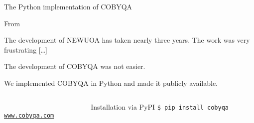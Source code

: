 \documentclass[
]{talk}
\begin{document}
\begin{frame}{The Python implementation of COBYQA}
    \begin{block}{From \textcite{Powell_2006}}
        \begin{quoting}
            \small%
            The development of NEWUOA has taken nearly \alert{three years}.
            The work was very \alert{frustrating} [\dots]
        \end{quoting}
        The development of COBYQA was \alert{not easier}.
    \end{block}

    \medskip

    We implemented COBYQA in \alert{Python} and made it publicly available.

    \medskip

    \begin{columns}
        \begin{column}{0.4\textwidth}
            \begin{center}
                \\[1ex]
                \href{https://www.cobyqa.com}{\texttt{www.cobyqa.com}}
            \end{center}
        \end{column}
        \begin{column}{0.6\textwidth}
            \begin{block}{Installation via PyPI}
                \texttt{\$ pip install cobyqa}
            \end{block}
        \end{column}
    \end{columns}
\end{frame}
\end{document}
